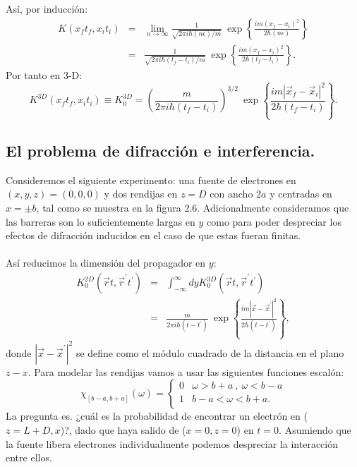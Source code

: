 Así, por inducción:
\begin{eqnarray}
\nonumber K(x_{f}t_{f},x_{i}t_{i})&=&\lim_{n\to\infty}\frac{1}{\sqrt{2\pi i\hbar(n\epsilon)/m}}\ \exp\left\{ \frac{im(x_{f}-x_{i})^{2}}{2\hbar(n\epsilon)}\right\} \\
&=& \frac{1}{\sqrt{2\pi i\hbar(t_{f}-t_{i})/m}}\ \exp\left\{ \frac{im(x_{f}-x_{i})^{2}}{2\hbar(t_{f}-t_{i})}\right\} .
\end{eqnarray}
Por tanto en 3-D:
\begin{equation}
K^{3D}(x_{f}t_{f},x_{i}t_{i})\equiv K_{0}^{3D}=\left(\frac{m}{2\pi i\hbar(t_{f}-t_{i})}\right)^{3/2}\ \exp\left\{ \frac{im|\vec{x}_{f}-\vec{x}_{i}|^{2}}{2\hbar(t_{f}-t_{i})}\right\} .
\end{equation}


\subsection{El problema de difracción e interferencia.}
Consideremos el siguiente experimento: una fuente de electrones en $(x,y,z)=(0,0,0)$ y dos rendijas en $z=D$ con ancho $2a$ y centradas en $x=\pm b$, tal como se muestra en la figura 2.6. Adicionalmente consideramos que las barreras son lo suficientemente largas en $y$ como para poder despreciar los efectos de difracción inducidos en el caso de que estas fueran finitas.\\
\\
Así reducimos la dimensión del propagador en $y$:
\begin{eqnarray}
\nonumber K_{0}^{2D}(\vec{r}t,\vec{r}^{\prime} t^{\prime})&=&\int_{-\infty}^{\infty}dyK_{0}^{3D}(\vec{r}t,\vec{r}^{\prime} t^{\prime})\\
&=& \frac{m}{2\pi i\hbar(t-t^{\prime})}\ \exp\left\{ \frac{im|\vec{x}-\vec{x}^{\prime}|^{2}}{2\hbar(t-t^{\prime})}\right\} ,
\end{eqnarray}
donde $|\vec{x}-\vec{x}^{\prime}|^{2}$ se define como el módulo cuadrado de la distancia en el plano $z-x$. Para modelar las rendijas vamos a usar las siguientes funciones escalón:
\[   
\chi_{[b-a,b+a]}(\omega) = 
     \begin{cases}
       0 &\omega>b+a\ ,\ \omega<b-a\\
       1 &b-a<\omega<b+a. \\
      
     \end{cases}
\]
La pregunta es. ¿cuál es la probabilidad de encontrar un electrón en ($z=L+D,x$)?, dado que haya salido de ($x=0,z=0$) en $t=0$. Asumiendo que la fuente libera electrones individualmente podemos despreciar la interacción entre ellos.
